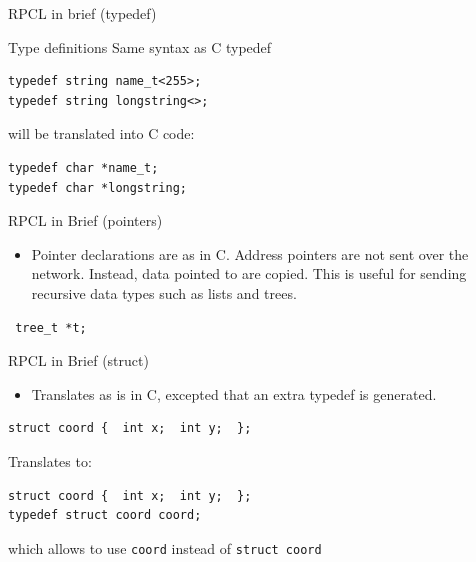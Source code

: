 \documentclass[bigger,hyperref={colorlinks=true, urlcolor=red, plainpages=false, pdfpagelabels, bookmarksnumbered}]{beamer}
\begin{document}
\begin{frame}[fragile,label=sec-2-22]{RPCL in brief (typedef)}
 \begin{block}{Type definitions}
Same syntax as C typedef
\lstset{language=C,label= ,caption= ,numbers=none}
\begin{lstlisting}
typedef string name_t<255>; 
typedef string longstring<>;
\end{lstlisting}
will be translated into C code:
\lstset{language=C,label= ,caption= ,numbers=none}
\begin{lstlisting}
typedef char *name_t;
typedef char *longstring;
\end{lstlisting}
\end{block}
\end{frame}

\begin{frame}[fragile,label=sec-2-23]{RPCL in Brief (pointers)}
 \begin{itemize}
\item Pointer declarations are as in C. Address pointers are not sent over the network. 
Instead, data pointed to are copied. This is useful for sending recursive data 
types such as lists and trees.
\end{itemize}
\lstset{language=C,label= ,caption= ,numbers=none}
\begin{lstlisting}
 tree_t *t;
\end{lstlisting}
\end{frame}
\begin{frame}[fragile,label=sec-2-24]{RPCL in Brief (struct)}
 \begin{itemize}
\item Translates as is in C, excepted that an extra typedef is generated.
\end{itemize}
\lstset{language=C,label= ,caption= ,numbers=none}
\begin{lstlisting}
struct coord {  int x;  int y;  };
\end{lstlisting}
Translates to:
\lstset{language=C,label= ,caption= ,numbers=none}
\begin{lstlisting}
struct coord {  int x;  int y;  };
typedef struct coord coord;
\end{lstlisting}
which allows to use \texttt{coord} instead of \texttt{struct coord}
\end{frame}
\end{document}
